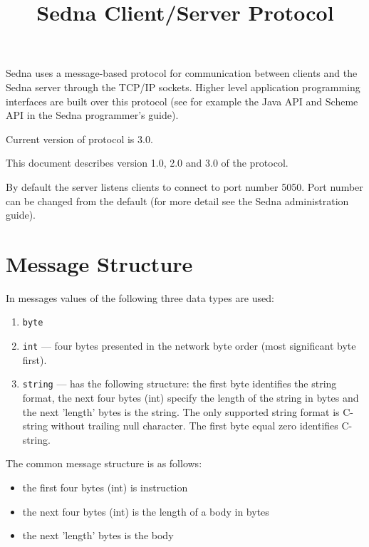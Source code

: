 \documentclass[a4paper,12pt]{article}
\title{Sedna Client/Server Protocol}
\date{}
\newcommand{\TocAt}[6]{}
\begin{document}
\maketitle

\TocAt*{section,subsection,subsubsection}
\TocAt*{subsection,subsubsection}

\tableofcontents


Sedna uses a message-based protocol for communication between clients and the Sedna server through the TCP/IP sockets. Higher level application programming interfaces are built over this protocol (see for example the Java API and Scheme API in the Sedna programmer's guide).

Current version of protocol is 3.0.

This document describes version 1.0, 2.0 and 3.0 of the protocol. 

By default the server listens clients to connect to port number 5050. Port number can be changed from the default (for more detail see the Sedna administration guide).


\section{Message Structure}
In messages values of the following three data types are used:
\begin{enumerate}
\item \verb!byte!
\item \verb!int! --- four bytes presented in the network byte order (most significant byte first).
\item \verb!string! --- has the following structure: the first byte identifies the string format, the next four bytes (int) specify the length of the string in bytes and the next 'length' bytes is the string. The only supported string format is C-string without trailing null character. The first byte equal zero identifies C-string. 
\end{enumerate}

The common message structure is as follows:
\begin{itemize} 
\item the first four bytes (int) is instruction 
\item the next four bytes (int) is the length of a body in bytes
\item the next 'length' bytes is the body 
\end{itemize} 
\end{document}
